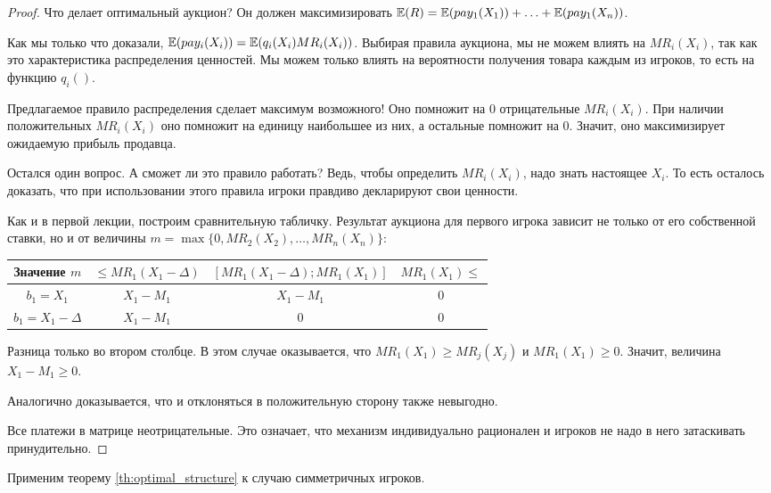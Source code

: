 \begin{proof}
Что делает оптимальный аукцион? Он должен максимизировать $ \operatorname{\mathbb{E}}(R)=\operatorname{\mathbb{E}}(pay_{1}(X_{1}))+\ldots+ \operatorname{\mathbb{E}}(pay_{1}(X_{n}))$.

Как мы только что доказали, $\operatorname{\mathbb{E}}(pay_{i}(X_{i}))=\operatorname{\mathbb{E}}(q_{i}(X_{i})MR_{i}(X_{i}))$. Выбирая правила аукциона, мы не можем влиять на $ MR_{i}(X_{i}) $, так как это характеристика распределения ценностей. Мы можем только влиять на вероятности получения товара каждым из игроков, то есть на функцию $ q_{i}() $.

Предлагаемое правило распределения сделает максимум возможного! Оно помножит на 0 отрицательные $ MR_{i}(X_{i}) $. При наличии положительных $ MR_{i}(X_{i}) $ оно помножит на единицу наибольшее из них, а остальные помножит на 0. Значит, оно максимизирует ожидаемую прибыль продавца.

Остался один вопрос. А сможет ли это правило работать? Ведь, чтобы определить $ MR_{i}(X_{i}) $, надо знать настоящее $ X_{i} $. То есть осталось доказать, что при использовании этого правила игроки правдиво декларируют свои ценности.

Как и в первой лекции, построим сравнительную табличку.  Результат аукциона для первого игрока зависит не только от его собственной ставки, но и от величины $m=\max\{0,MR_{2}(X_{2}),\ldots,MR_{n}(X_{n})\}$:

\begin{tabular}{cccc}
\toprule
Значение $m$ & $\leq MR_{1}(X_{1}-\Delta)$ & $ [MR_{1}(X_{1}-\Delta);MR_{1}(X_{1})] $ & $MR_{1}(X_{1})\leq $ \\
\midrule
$ b_{1}=X_{1} $ & $ X_{1}-M_{1} $ & $ X_{1}-M_{1} $ &  0\\
$b_{1}=X_{1}-\Delta $ & $ X_{1}-M_{1} $ & 0 & 0 \\
\bottomrule
\end{tabular}

Разница только во втором столбце. В этом случае оказывается, что $MR_{1}(X_{1})\geq MR_{j}(X_{j})$ и $MR_{1}(X_{1})\geq 0$. Значит, величина $ X_{1}-M_{1}\geq 0 $.

Аналогично доказывается, что и отклоняться в положительную сторону также невыгодно.

Все платежи в матрице неотрицательные. Это означает, что механизм индивидуально рационален и игроков не надо в него затаскивать принудительно.
\end{proof}

Применим теорему \ref{th:optimal_structure} к случаю симметричных игроков.


